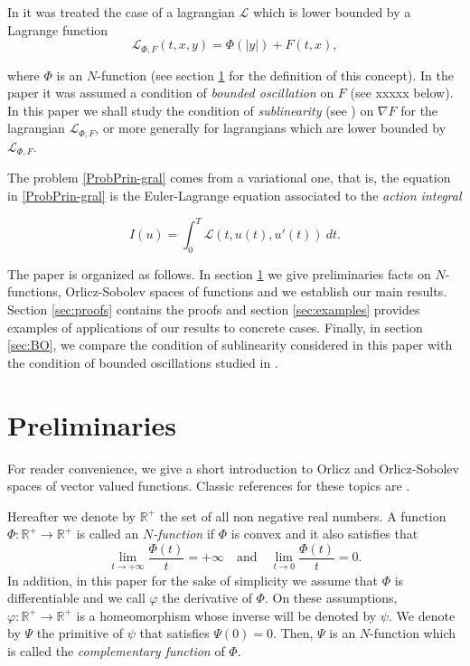 \documentclass[twoside]{article}
\theoremstyle{remark}
\newcounter{example}
\begin{document}
In \cite{ABGMS2015} it was treated  the case of a lagrangian $\mathcal{L}$ which is lower bounded by a Lagrange function
\begin{equation}\label{eq:lagrange_phi}
\mathcal{L}_{\Phi,F}(t,x,y)=\Phi(|y|)+F(t,x),
\end{equation}

where  $\Phi$ is an $N$-function (see section \ref{preliminares} for the definition of this concept).  
In the paper \cite{ABGMS2015} it was assumed  a condition of \emph{bounded oscillation} on $F$  (see xxxxx below). 
In this paper we shall study the condition of \emph{sublinearity} (see  \cite{tang1998periodic,wu1999periodic,zhao2004periodic,tang2010periodic,zhao2005existence}) on $\nabla F$ for the lagrangian  $\mathcal{L}_{\Phi,F}$, or more generally for lagrangians which are lower bounded by $\mathcal{L}_{\Phi,F}$.


The problem \eqref{ProbPrin-gral} comes from a variational one, that is,  the equation in  \eqref{ProbPrin-gral} is the Euler-Lagrange equation associated to the \emph{action integral}

\begin{equation}\label{integral_accion}
I(u)=\int_{0}^T \mathcal{L}(t,u(t),u'(t))\ dt.
\end{equation}

The paper is organized as follows. In section \ref{preliminares} we give preliminaries facts on $N$-functions, Orlicz-Sobolev spaces of functions and we establish our main results. Section \ref{sec:proofs} contains the proofs and section \ref{sec:examples} provides examples of applications of our results to concrete cases. Finally, in section \ref{sec:BO}, we compare the condition of sublinearity considered in this paper with the condition of bounded oscillations studied in \cite{ABGMS2015}.

\section{Preliminaries}\label{preliminares}

For reader convenience, we give a short introduction to Orlicz and Orlicz-Sobolev spaces of vector valued functions. Classic references for these topics are \cite{adams_sobolev,KR,rao1991theory}. 

Hereafter we denote  by $\mathbb{R}^+$  the set of all non negative real numbers. A function $\Phi:\mathbb{R}^+\to \mathbb{R}^+ $ is called an \emph{$N$-function} if $\Phi$ is convex and it also satisfies that
\[
\lim_{t\to+\infty}\frac{\Phi(t)}{t}=+\infty\quad\text{and}\quad \lim_{t\to 0}\frac{\Phi(t)}{t}=0.
\]
In addition,  in this paper for the sake of simplicity  we assume that $\Phi$ is differentiable and we call $\varphi$  the derivative of $\Phi$. 
On these assumptions, $\varphi:\mathbb{R}^+\rightarrow \mathbb{R}^+$ is a homeomorphism whose inverse will be denoted by $\psi$. 
We denote by $\Psi$ the primitive of $\psi$ that satisfies $\Psi(0)=0$. Then, $\Psi$ is an $N$-function which  is called the \emph{complementary function} of $\Phi$.
\end{document}
